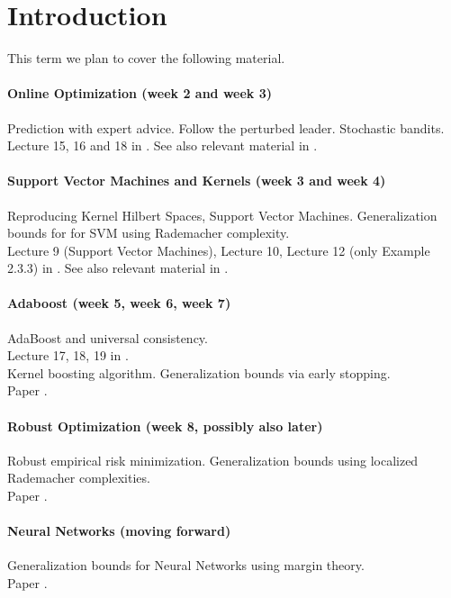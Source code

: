 
\chapter{Introduction}

This term we plan to cover the following material.

\subsubsection*{Online Optimization (week 2 and week 3)}
Prediction with expert advice. Follow the perturbed leader. Stochastic bandits.\\
Lecture 15, 16 and 18 in \cite{rigollet}. See also relevant material in \cite{barlett08}.

\subsubsection*{Support Vector Machines and Kernels (week 3 and week 4)}
Reproducing Kernel Hilbert Spaces, Support Vector Machines. Generalization bounds for for SVM using Rademacher complexity.\\
Lecture 9 (Support Vector Machines), Lecture 10, Lecture 12 (only Example 2.3.3) in \cite{rigollet}. See also relevant material in \cite{barlett08}.

\subsubsection*{Adaboost (week 5, week 6, week 7)}
AdaBoost and universal consistency.\\
Lecture 17, 18, 19 in \cite{barlett16}.\\

\noindent Kernel boosting algorithm. Generalization bounds via early stopping.\\
Paper \cite{wain17ada}.

\subsubsection*{Robust Optimization (week 8, possibly also later)}
Robust empirical risk minimization. Generalization bounds using localized Rademacher complexities.\\
Paper \cite{duchi17roubust}.

\subsubsection*{Neural Networks (moving forward)}
Generalization bounds for Neural Networks using margin theory.\\
Paper \cite{DBLP:journals/corr/BartlettFT17}.
